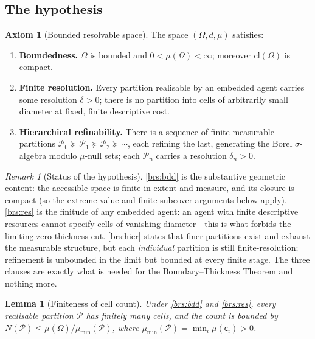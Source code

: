 \documentclass[11pt,a4paper]{article}
\theoremstyle{thmstyle}
\newtheorem{lemma}[theorem]{Lemma}
\theoremstyle{definition}
\newtheorem{axiom}{Axiom}
\theoremstyle{remark}
\newtheorem{remark}[theorem]{Remark}
\newcommand{\Space}{\Omega}
\newcommand{\cl}{\mathrm{cl}}
\newcommand{\reso}{\delta}
\newcommand{\Part}{\mathscr{P}}
\newcommand{\cell}{\mathsf{c}}
\begin{document}
\subsection{The hypothesis}

\begin{axiom}[Bounded resolvable space]
\label{ax:brs}
The space $(\Space,d,\mu)$ satisfies:
\begin{enumerate}[label=\textup{(BRS\arabic*)},leftmargin=3.2em]
\item\label{brs:bdd} \textbf{Boundedness.} $\Space$ is bounded and
$0<\mu(\Space)<\infty$; moreover $\cl(\Space)$ is compact.
\item\label{brs:res} \textbf{Finite resolution.} Every partition realisable by
an embedded agent carries some resolution $\reso>0$; there is no partition into
cells of arbitrarily small diameter at fixed, finite descriptive cost.
\item\label{brs:hier} \textbf{Hierarchical refinability.} There is a sequence of
finite measurable partitions $\Part_0\succeq\Part_1\succeq\Part_2\succeq\cdots$,
each refining the last, generating the Borel $\sigma$-algebra modulo $\mu$-null
sets; each $\Part_n$ carries a resolution $\reso_n>0$.
\end{enumerate}
\end{axiom}

\begin{remark}[Status of the hypothesis]
\label{rem:brs-status}
\ref{brs:bdd} is the substantive geometric content: the accessible space is
finite in extent and measure, and its closure is compact (so the
extreme-value and finite-subcover arguments below apply). \ref{brs:res} is the
finitude of any embedded agent: an agent with finite descriptive resources
cannot specify cells of vanishing diameter---this is what forbids the limiting
zero-thickness cut. \ref{brs:hier} states that finer partitions exist and
exhaust the measurable structure, but each \emph{individual} partition is still
finite-resolution; refinement is unbounded in the limit but bounded at every
finite stage. The three clauses are exactly what is needed for the
Boundary--Thickness Theorem and nothing more.
\end{remark}

\begin{lemma}[Finiteness of cell count]
\label{lem:finite-cells}
Under \ref{brs:bdd} and \ref{brs:res}, every realisable partition $\Part$ has
finitely many cells, and the count is bounded by
$N(\Part)\le \mu(\Space)/\mu_{\min}(\Part)$, where
$\mu_{\min}(\Part)=\min_i\mu(\cell_i)>0$.
\end{lemma}
\end{document}
